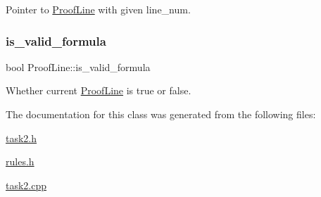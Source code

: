 Pointer to \mbox{\hyperlink{classProofLine}{Proof\+Line}} with given line\+\_\+num. 

\mbox{\label{classProofLine_a8531e674967263c2e6ba67d8bf12a336}} 
\subsubsection{\texorpdfstring{is\+\_\+valid\+\_\+formula}{is\_valid\_formula}}
{\footnotesize\ttfamily bool Proof\+Line\+::is\+\_\+valid\+\_\+formula}



Whether current \mbox{\hyperlink{classProofLine}{Proof\+Line}} is true or false. 



The documentation for this class was generated from the following files\+:\begin{DoxyCompactItemize}
\item 
\mbox{\hyperlink{task2_8h}{task2.\+h}}\item 
\mbox{\hyperlink{rules_8h}{rules.\+h}}\item 
\mbox{\hyperlink{task2_8cpp}{task2.\+cpp}}\end{DoxyCompactItemize}
